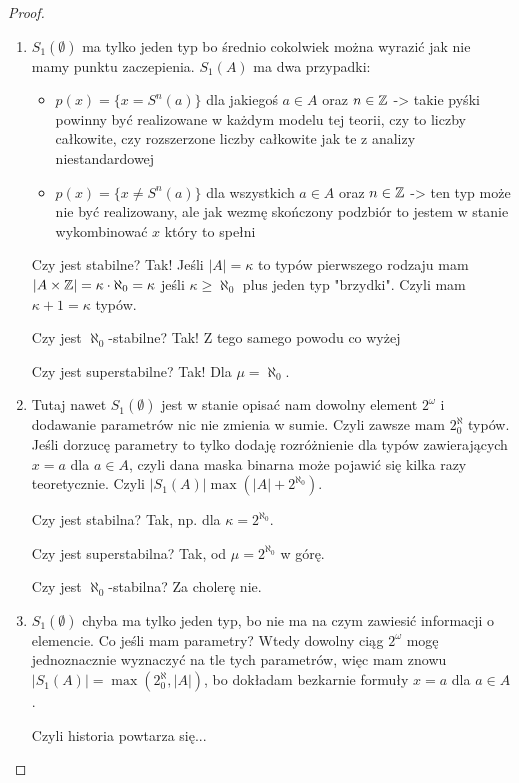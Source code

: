 \begin{proof}
  \begin{enumerate}
    \item $S_1(\emptyset)$ ma tylko jeden typ bo średnio cokolwiek można wyrazić jak nie mamy punktu zaczepienia. $S_1(A)$ ma dwa przypadki:
      \begin{itemize}
        \item $p(x)=\{x=S^n(a)\}$ dla jakiegoś $a\in A$ oraz $n\in\mathbb{Z}$ -> takie pyśki powinny być realizowane w każdym modelu tej teorii, czy to liczby całkowite, czy rozszerzone liczby całkowite jak te z analizy niestandardowej
        \item $p(x)=\{x\neq S^n(a)\}$ dla wszystkich $a\in A$ oraz $n\in\mathbb{Z}$ -> ten typ może nie być realizowany, ale jak wezmę skończony podzbiór to jestem w stanie wykombinować $x$ który to spełni
      \end{itemize}

      Czy jest stabilne? Tak! Jeśli $|A|=\kappa$ to typów pierwszego rodzaju mam $|A\times \mathbb{Z}|=\kappa\cdot \aleph_0=\kappa$ jeśli $\kappa\geq \aleph_0$ plus jeden typ "brzydki". Czyli mam $\kappa+1=\kappa$ typów.

      Czy jest $\aleph_0$-stabilne? Tak! Z tego samego powodu co wyżej
      
      Czy jest superstabilne? Tak! Dla $\mu=\aleph_0$.

    \item Tutaj nawet $S_1(\emptyset)$ jest w stanie opisać nam dowolny element $2^\omega$ i dodawanie parametrów nic nie zmienia w sumie. Czyli zawsze mam $2^\aleph_0$ typów. Jeśli dorzucę parametry to tylko dodaję rozróżnienie dla typów zawierających $x=a$ dla $a\in A$, czyli dana maska binarna może pojawić się kilka razy teoretycznie. Czyli $|S_1(A)|\max(|A|+2^{\aleph_0})$.

      Czy jest stabilna? Tak, np. dla $\kappa=2^{\aleph_0}$.

      Czy jest superstabilna? Tak, od $\mu=2^{\aleph_0}$ w górę.
      
      Czy jest $\aleph_0$-stabilna? Za cholerę nie.

    \item $S_1(\emptyset)$ chyba ma tylko jeden typ, bo nie ma na czym zawiesić informacji o elemencie. Co jeśli mam parametry? Wtedy dowolny ciąg $2^\omega$ mogę jednoznacznie wyznaczyć na tle tych parametrów, więc mam znowu $|S_1(A)|=\max(2^\aleph_0,|A|)$, bo dokładam bezkarnie formuły $x=a$ dla $a\in A$. 

      Czyli historia powtarza się...


\end{enumerate}
\end{proof}
